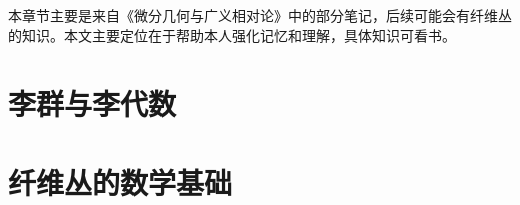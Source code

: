 \documentclass[lang=cn,chinesefont = nofont ,10pt,scheme=chinese]{elegantbook}
\begin{document}
\maketitle
\frontmatter
\tableofcontents
\mainmatter
本章节主要是来自《微分几何与广义相对论》中的部分笔记，后续可能会有纤维丛的知识。本文主要定位在于帮助本人强化记忆和理解，具体知识可看书。
\part{李群与李代数}

\part{纤维丛的数学基础}


\end{document}

